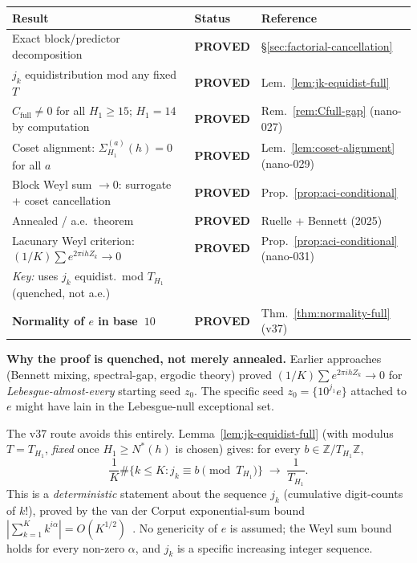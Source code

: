 \documentclass[
]{article}
\begin{document}
\begin{center}
\begin{tabular}{lll}
\toprule
Result & Status & Reference \\
\midrule
Exact block/predictor decomposition
  & \textbf{PROVED} & \S\ref{sec:factorial-cancellation} \\
$j_k$ equidistribution mod any fixed $T$
  & \textbf{PROVED} & Lem.~\ref{lem:jk-equidist-full} \\
$C_{\mathrm{full}}\ne 0$ for all $H_1\ge 15$; $H_1=14$ by computation
  & \textbf{PROVED} & Rem.~\ref{rem:Cfull-gap} (nano-027) \\
Coset alignment: $\Sigma_{H_1}^{(a)}(h)=0$ for all $a$
  & \textbf{PROVED} & Lem.~\ref{lem:coset-alignment} (nano-029) \\
Block Weyl sum $\to 0$: surrogate + coset cancellation
  & \textbf{PROVED} & Prop.~\ref{prop:aci-conditional} \\
Annealed / a.e.\ theorem
  & \textbf{PROVED} & Ruelle \cite{Ruelle76} + Bennett (2025) \\
\midrule
Lacunary Weyl criterion: $(1/K)\sum e^{2\pi ih Z_k}\to 0$
  & \textbf{PROVED} & Prop.~\ref{prop:aci-conditional} (nano-031) \\
\quad\emph{Key:} uses $j_k$ equidist.\ mod $T_{H_1}$ (quenched, not a.e.)
  & & \\
\midrule
\textbf{Normality of $e$ in base~$10$}
  & \textbf{PROVED} & Thm.~\ref{thm:normality-full} (v37) \\
\bottomrule
\end{tabular}
\end{center}

\medskip\noindent
\textbf{Why the proof is quenched, not merely annealed.}
Earlier approaches (Bennett mixing, spectral-gap, ergodic theory) proved
$(1/K)\sum e^{2\pi ih Z_k}\to 0$ for \emph{Lebesgue-almost-every}
starting seed $z_0$.  The specific seed $z_0 = \{10^{j_1}e\}$ attached
to $e$ might have lain in the Lebesgue-null exceptional set.

The v37 route avoids this entirely.
Lemma~\ref{lem:jk-equidist-full} (with modulus $T = T_{H_1}$, \emph{fixed}
once $H_1\ge N^*(h)$ is chosen) gives:
for every $b\in\mathbb{Z}/T_{H_1}\mathbb{Z}$,
\[
  \frac{1}{K}\#\{k\le K : j_k\equiv b\pmod{T_{H_1}}\}\;\to\;\frac{1}{T_{H_1}}.
\]
This is a \emph{deterministic} statement about the sequence $j_k$
(cumulative digit-counts of $k!$), proved by the van der Corput
exponential-sum bound $|\sum_{k=1}^K k^{i\alpha}|=O(K^{1/2})$~\cite{Weyl16,VdC31}.
No genericity of $e$ is assumed; the Weyl sum bound holds for every
non-zero $\alpha$, and $j_k$ is a specific increasing integer sequence.
\end{document}
